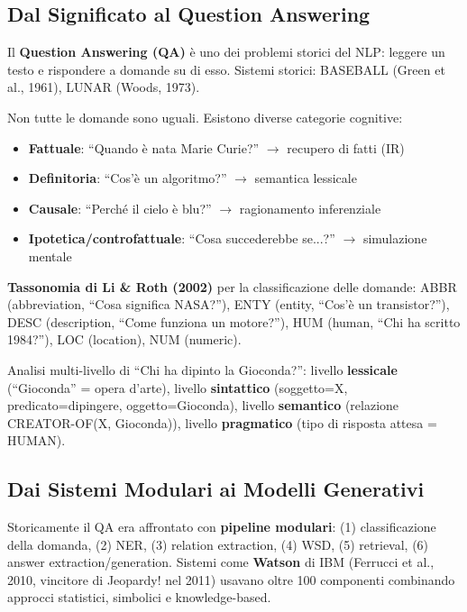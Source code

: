\documentclass[12pt,a4paper]{article}
\begin{document}
\subsection{Dal Significato al Question Answering}

Il \textbf{Question Answering (QA)} \`e uno dei problemi storici del NLP: leggere un testo e rispondere a domande su di esso. Sistemi storici: BASEBALL (Green et al., 1961), LUNAR (Woods, 1973).

\begin{defbox}
Non tutte le domande sono uguali. Esistono diverse categorie cognitive:
\begin{itemize}
  \item \textbf{Fattuale}: ``Quando \`e nata Marie Curie?'' $\to$ recupero di fatti (IR)
  \item \textbf{Definitoria}: ``Cos'\`e un algoritmo?'' $\to$ semantica lessicale
  \item \textbf{Causale}: ``Perch\'e il cielo \`e blu?'' $\to$ ragionamento inferenziale
  \item \textbf{Ipotetica/controfattuale}: ``Cosa succederebbe se...?'' $\to$ simulazione mentale
\end{itemize}
\end{defbox}

\textbf{Tassonomia di Li \& Roth (2002)} per la classificazione delle domande: ABBR (abbreviation, ``Cosa significa NASA?''), ENTY (entity, ``Cos'\`e un transistor?''), DESC (description, ``Come funziona un motore?''), HUM (human, ``Chi ha scritto 1984?''), LOC (location), NUM (numeric).

\begin{examplebox}
Analisi multi-livello di ``Chi ha dipinto la Gioconda?'': livello \textbf{lessicale} (``Gioconda'' = opera d'arte), livello \textbf{sintattico} (soggetto=X, predicato=dipingere, oggetto=Gioconda), livello \textbf{semantico} (relazione CREATOR-OF(X, Gioconda)), livello \textbf{pragmatico} (tipo di risposta attesa = HUMAN).
\end{examplebox}

\subsection{Dai Sistemi Modulari ai Modelli Generativi}

Storicamente il QA era affrontato con \textbf{pipeline modulari}: (1) classificazione della domanda, (2) NER, (3) relation extraction, (4) WSD, (5) retrieval, (6) answer extraction/generation. Sistemi come \textbf{Watson} di IBM (Ferrucci et al., 2010, vincitore di Jeopardy! nel 2011) usavano oltre 100 componenti combinando approcci statistici, simbolici e knowledge-based.
\end{document}
